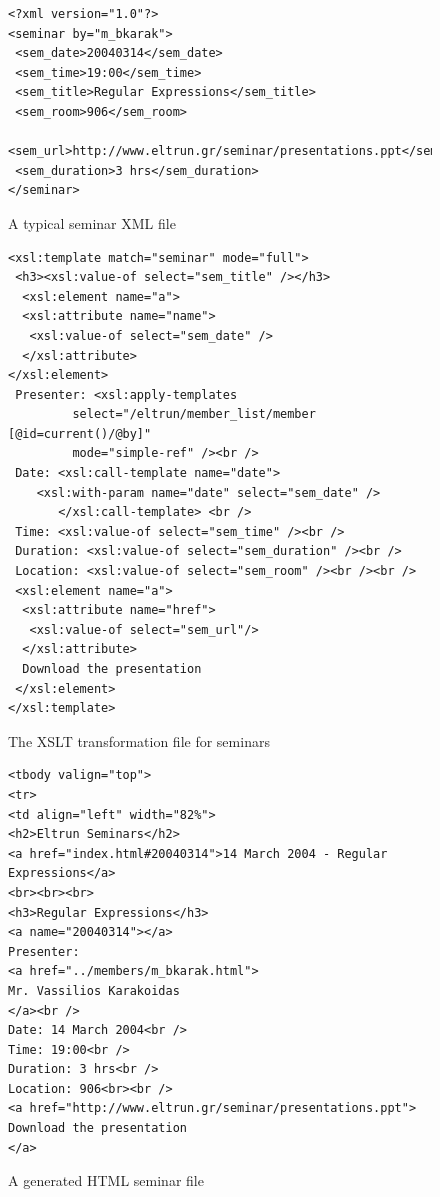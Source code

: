 \documentclass[10pt]{article}
\begin{document}
\begin{figure}
\lstset{language=MYLANG,basicstyle=\ttfamily}
{\begin{lstlisting}
<?xml version="1.0"?>
<seminar by="m_bkarak">
 <sem_date>20040314</sem_date>
 <sem_time>19:00</sem_time>
 <sem_title>Regular Expressions</sem_title>
 <sem_room>906</sem_room>
 <sem_url>http://www.eltrun.gr/seminar/presentations.ppt</sem_url>
 <sem_duration>3 hrs</sem_duration>
</seminar>
\end{lstlisting}}
\caption{A typical seminar XML file}
\label{fig:project-xml}
\end{figure}

\begin{figure}
\lstset{language=MYLANG,basicstyle=\ttfamily}
{\begin{lstlisting}
<xsl:template match="seminar" mode="full">
 <h3><xsl:value-of select="sem_title" /></h3>
  <xsl:element name="a">
  <xsl:attribute name="name">
   <xsl:value-of select="sem_date" />
  </xsl:attribute>
</xsl:element>
 Presenter: <xsl:apply-templates 
 	     select="/eltrun/member_list/member [@id=current()/@by]" 
	     mode="simple-ref" /><br />
 Date: <xsl:call-template name="date">
	<xsl:with-param name="date" select="sem_date" />
       </xsl:call-template> <br />
 Time: <xsl:value-of select="sem_time" /><br />
 Duration: <xsl:value-of select="sem_duration" /><br />
 Location: <xsl:value-of select="sem_room" /><br /><br />
 <xsl:element name="a">
  <xsl:attribute name="href">
   <xsl:value-of select="sem_url"/>
  </xsl:attribute>
  Download the presentation
 </xsl:element>
</xsl:template>
\end{lstlisting}}
\caption{The XSLT transformation file for seminars}
\label{fig:project-xslt}
\end{figure}

\begin{figure}
\lstset{language=MYLANG,basicstyle=\ttfamily}
{\begin{lstlisting}
<tbody valign="top">
<tr>
<td align="left" width="82%">
<h2>Eltrun Seminars</h2>
<a href="index.html#20040314">14 March 2004 - Regular Expressions</a>
<br><br><br>
<h3>Regular Expressions</h3>
<a name="20040314"></a>
Presenter: 
<a href="../members/m_bkarak.html">
Mr. Vassilios Karakoidas
</a><br />
Date: 14 March 2004<br />
Time: 19:00<br />
Duration: 3 hrs<br />
Location: 906<br><br />
<a href="http://www.eltrun.gr/seminar/presentations.ppt">
Download the presentation
</a>
\end{lstlisting}}
\caption{A generated HTML seminar file}
\label{fig:project-html}
\end{figure}
\end{document}
